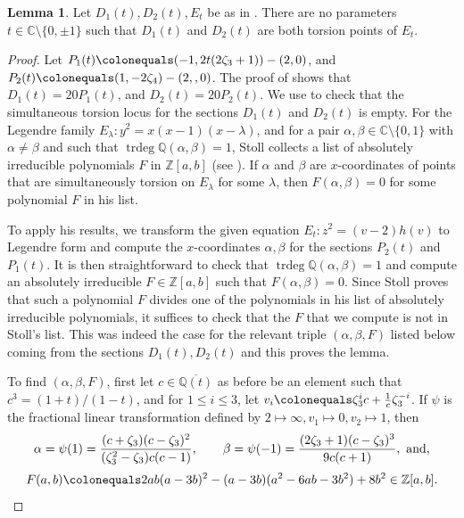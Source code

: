 \documentclass[reqno,10pt]{amsart}
\theoremstyle{definition}
\theoremstyle{definition}
\newtheorem{lem}[thm]{Lemma}
\def\C{{\mathbb C}}
\def\Z{{\mathbb Z}}
\def\Q{{\mathbb Q}}
\def\C{{\mathbb C}}
\DeclareMathOperator{\trdeg}{trdeg}
\begin{document}
\begin{lem}\label{lem:StollTors} Let $D_1(t),D_2(t),E_t$ be as in . There are no parameters $t \in \C \setminus \{0,\pm 1 \}$ such that $D_1(t)$ and $D_2(t)$ are both torsion points of $E_t$.
\end{lem}
\begin{proof} Let $P_1(t) \colonequals (-1, 2t(2\zeta_3+1)) - (2,0)$, and $P_2(t) \colonequals (1,-2\zeta_4) - (2,,0)$. The proof of  shows that $D_1(t) = 20P_1(t)$, and $D_2(t) = 20P_2(t)$. We use \cite[Corollary~22]{Stoll} to check that the simultaneous torsion locus for the sections $D_1(t)$ and $D_2(t)$ is empty. For the Legendre family $E_{\lambda} \colon y^2=x(x-1)(x-\lambda)$, and for a pair $\alpha,\beta \in \C \setminus \{0,1\}$ with $\alpha \neq \beta$ and such that $\trdeg \Q(\alpha,\beta) = 1$, Stoll collects a list   of absolutely irreducible polynomials $F$ in $\Z[a,b]$ (see \cite{StollCurves}). If $\alpha$ and $\beta$ are $x$-coordinates of points that are simultaneously torsion on $E_{\lambda}$ for some $\lambda$, then $F(\alpha,\beta) = 0$ for some polynomial $F$ in his list. 

To apply his results, we transform the given equation $E_t \colon z^2=(v-2)h(v)$ to Legendre form and compute the $x$-coordinates $\alpha,\beta$ for the sections $P_2(t)$ and $P_1(t)$. It is then straightforward to check that $\trdeg \Q(\alpha,\beta) = 1$ and compute an absolutely irreducible $F \in \Z[a,b]$ such that $F(\alpha,\beta) = 0$. Since Stoll proves that such a polynomial $F$ divides one of the polynomials in his list of absolutely irreducible polynomials, it suffices to check that the $F$ that we compute is not in Stoll's list. This was indeed the case for the relevant triple $(\alpha,\beta, F)$ listed below coming from the sections $D_1(t),D_2(t)$ and this proves the lemma. 


To find $(\alpha, \beta, F)$, first let $c \in \overline{\Q(t)}$ as before be an element such that $c^3=(1+t)/(1-t)$, and for $1 \leq i \leq 3$, let $v_i \colonequals \zeta_3^i c + \frac{1}{c} \zeta_3^{-i}$. If $\psi$ is the fractional linear transformation defined by $2 \mapsto \infty, v_1 \mapsto 0, v_2 \mapsto 1$, then
\[ \alpha = \psi(1)=\frac{(c+\zeta_3)(c-\zeta_3)^2}{(\zeta_3^2-\zeta_3)c(c-1)}, \quad \quad
\beta = \psi(-1) = \frac{(2\zeta_3+1)(c-\zeta_3)^3}{9c(c+1)}, \textup{ and,} \]
\[ F(a,b) \colonequals 2ab(a - 3b)^2 - (a - 3b)(a^2 - 6ab - 3b^2) + 8b^2 \in \Z[a,b].\qedhere\] 
\end{proof}
\end{document}
